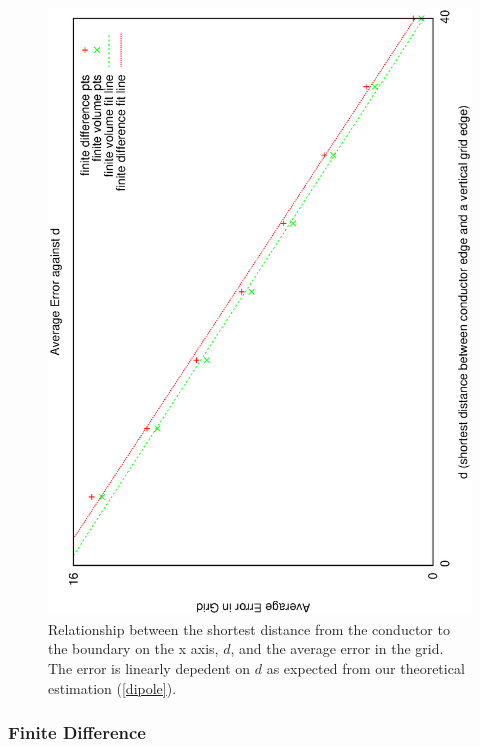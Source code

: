 \documentclass[aps,twocolumn,pre,nofootinbib,10pt]{revtex4-1}
\begin{document}
\begin{figure}
\includegraphics[height=\breite \columnwidth,angle=-90]{position.eps}
\caption{Relationship between the shortest distance from the conductor to the boundary on the x axis, $d$, and the average error in the grid. The error is linearly depedent on $d$ as expected from our theoretical estimation (\ref{dipole}).}
\label{fig:fd_distance}
\end{figure}


\subsubsection{Finite Difference}
\end{document}
